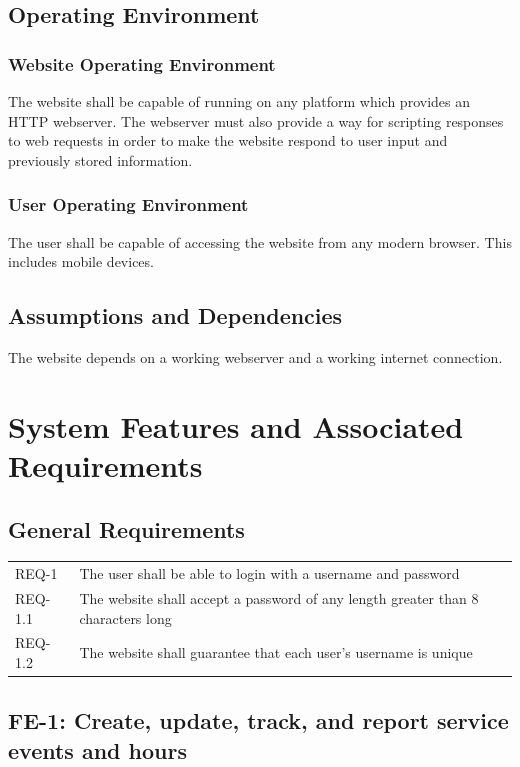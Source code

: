 \documentclass{article}
\newcommand{\req}[1]{REQ-{#1}}
\begin{document}
\subsection{Operating Environment}

\subsubsection{Website Operating Environment}

The website shall be capable of running on any platform which provides
an HTTP webserver. The webserver must also provide a way for scripting
responses to web requests in order to make the website respond to user
input and previously stored information.

\subsubsection{User Operating Environment}

The user shall be capable of accessing the website from any modern
browser. This includes mobile devices.

\subsection{Assumptions and Dependencies}

The website depends on a working webserver and a working internet
connection.

\section{System Features and Associated Requirements}

\subsection{General Requirements}

\begin{tabular}{lp{8cm}}
\req{1} & The user shall be able to login with a username and password\\
\req{1.1} & The website shall accept a password of any length greater than 8 characters long\\
\req{1.2} & The website shall guarantee that each user's username is
unique\\
\end{tabular}

\subsection{FE-1: Create, update, track, and report service events and
  hours}
\end{document}

